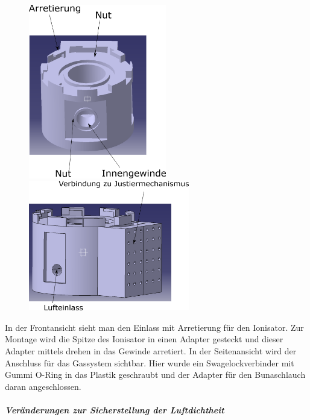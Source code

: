 \begin{figure}[h]
	\begin{minipage}[hbt]{6.0cm}
		\centering
		\includegraphics[width=6.0cm]{Zylinder_frontal.png}
		\caption[Zylinder V1 frontal]{}
	\end{minipage}
	\hfill
	\begin{minipage}[hbt]{7cm}
		\centering
		\includegraphics[width=7cm]{Zylinder_seitlich.png}
		\caption[Zylinder V1 seitlich]{}
	\end{minipage}
\end{figure}

In der Frontansicht sieht man den Einlass mit Arretierung für den Ionisator. Zur Montage wird die Spitze des Ionisator in einen Adapter gesteckt und dieser Adapter mittels drehen in das Gewinde arretiert. In der Seitenansicht wird der Anschluss für das Gassystem sichtbar. Hier wurde ein Swagelockverbinder mit Gummi O-Ring in das Plastik geschraubt und der Adapter für den Bunaschlauch daran angeschlossen.

\subparagraph{Veränderungen zur Sicherstellung der Luftdichtheit}
\hfill \\

